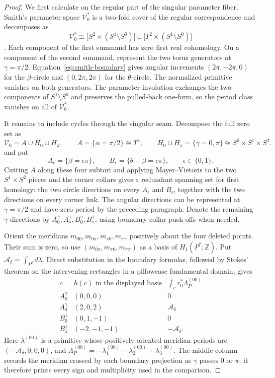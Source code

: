 \documentclass[11pt,reqno]{amsart}
\theoremstyle{plain}
\theoremstyle{definition}
\newcommand{\Z}{\mathbb{Z}}
\begin{document}
\begin{proof}
We first calculate on the regular part of the singular parameter fiber.  Smith's parameter space
$\mathcal V_0^*$ is a two-fold cover of the regular correspondence and decomposes as
\[
 \mathcal V_0^*\cong
 \bigl[S^2\times(S^1\setminus S^0)\bigr]
 \sqcup
 \bigl[T^2\times(S^1\setminus S^0)\bigr]
\]
\cite[Def.~3.6]{Smith}.  Each component of the first summand has zero first real cohomology.  On a
component of the second summand, represent the two torus generators at $\gamma=\pi/2$.
Equation~\eqref{eq:smith-boundary} gives angular increments $(2\pi,-2\pi,0)$ for the
$\beta$-circle and $(0,2\pi,2\pi)$ for the $\theta$-circle.  The normalized primitive vanishes on
both generators.  The parameter involution exchanges the two components of
$S^1\setminus S^0$ and preserves the pulled-back one-form, so the period class vanishes on all of
$\mathcal V_0^*$.

It remains to include cycles through the singular seam.  Decompose the full zero set as
\[
 \mathcal V_0=A\cup H_0\cup H_\pi,
 \qquad
 A=\{\alpha=\pi/2\}\cong T^3,
 \qquad
 H_0\sqcup H_\pi=\{\gamma=0,\pi\}\cong S^0\times S^1\times S^2.
\]
and put
\[
 A_\epsilon=\{\beta=\epsilon\pi\},
 \qquad
 B_\epsilon=\{\theta-\beta=\epsilon\pi\},
 \qquad \epsilon\in\{0,1\}.
\]
Cutting $A$ along these four subtori and applying Mayer--Vietoris to the two
$S^1\times S^2$ pieces and the corner collars gives a redundant spanning set for first homology:
the two circle directions on every $A_\epsilon$ and $B_\epsilon$, together with the two directions
on every corner link.  The angular directions can be represented at $\gamma=\pi/2$ and have zero
period by the preceding paragraph.  Denote the remaining $\gamma$-directions by
$A_0^\gamma,A_\pi^\gamma,B_0^\gamma,B_\pi^\gamma$, using boundary-collar push-offs when needed.

Orient the meridians $m_{00},m_{0\pi},m_{\pi0},m_{\pi\pi}$ positively about the four deleted
points.  Their sum is zero, so use $(m_{0\pi},m_{\pi0},m_{\pi\pi})$ as a basis of
$H_1(P^*;\Z)$.  Put $\mathcal A_\delta=\int_{P^\delta}d\lambda$.  Direct substitution in the
boundary formulas, followed by Stokes' theorem on the intervening rectangles in a pillowcase
fundamental domain, gives
\begin{equation}\label{eq:singular-gamma-table}
\begin{array}{c|c|c}
c&h(c)\text{ in the displayed basis}&
 \displaystyle\int_c r_0^*\Lambda_P^{(00)}\\ \hline
A_0^\gamma&(0,0,0)&0\\
A_\pi^\gamma&(2,0,2)&\mathcal A_\delta\\
B_0^\gamma&(0,1,-1)&0\\
B_\pi^\gamma&(-2,-1,-1)&-\mathcal A_\delta.
\end{array}
\end{equation}
Here $\lambda^{(00)}$ is a primitive whose positively oriented meridian periods are
$(-\mathcal A_\delta,0,0,0)$, and
$\Lambda_P^{(00)}=-\lambda_1^{(00)}-\lambda_2^{(00)}+\lambda_3^{(00)}$.  The middle column records
the meridian crossed by each boundary projection as $\gamma$ passes $0$ or $\pi$; it therefore
prints every sign and multiplicity used in the comparison.


\end{proof}
\end{document}
